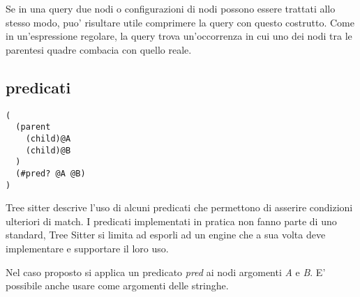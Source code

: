 Se in una query due nodi o configurazioni di nodi possono essere trattati allo stesso modo, puo' risultare utile comprimere la query con questo costrutto.
Come in un'espressione regolare, la query trova un'occorrenza in cui uno dei nodi tra le parentesi quadre combacia con quello reale.


\subsection{predicati}

\begin{lstlisting}
(
  (parent
    (child)@A
    (child)@B
  )
  (#pred? @A @B)
)
\end{lstlisting}

Tree sitter descrive l'uso di alcuni predicati che permettono di asserire condizioni ulteriori di match.
I predicati implementati in pratica non fanno parte di uno standard, Tree Sitter si limita ad esporli ad un engine che a sua volta deve implementare e supportare il loro uso.

Nel caso proposto si applica un predicato \emph{pred} ai nodi argomenti \emph{A} e \emph{B}.
E' possibile anche usare come argomenti delle stringhe.
